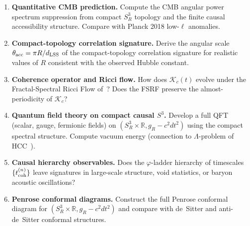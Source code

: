 \documentclass[12pt,a4paper]{article}
\theoremstyle{plain}
\theoremstyle{definition}
\theoremstyle{remark}
\newcommand{\vph}{\varphi}
\begin{document}
\begin{enumerate}[label=\textbf{Q\arabic*.},leftmargin=1.8em]
  \item \textbf{Quantitative CMB prediction.}
    Compute the CMB angular power spectrum suppression from compact $S^3_R$
    topology and the finite causal accessibility structure.
    Compare with Planck 2018 low-$\ell$ anomalies.
  \item \textbf{Compact-topology correlation signature.}
    Derive the angular scale $\theta_{\rm acc} = \pi R/d_{\rm LSS}$
    of the compact-topology correlation signature
    for realistic values of $R$ consistent with the observed Hubble constant.
  \item \textbf{Coherence operator and Ricci flow.}
    How does $\mathcal{K}_c(t)$ evolve under the Fractal-Spectral Ricci Flow
    of~\cite{PB25a}?
    Does the FSRF preserve the almost-periodicity of $\mathcal{K}_c$?
  \item \textbf{Quantum field theory on compact causal $S^3$.}
    Develop a full QFT (scalar, gauge, fermionic fields) on
    $(S^3_R\times\mathbb{R}, g_R - c^2dt^2)$ using the compact spectral structure.
    Compute vacuum energy (connection to $\Lambda$-problem of HCC~\cite{HCC25}).
  \item \textbf{Causal hierarchy observables.}
    Does the $\vph$-ladder hierarchy of timescales $\{t_{\rm coh}^{(n)}\}$
    leave signatures in large-scale structure, void statistics, or baryon
    acoustic oscillations?
  \item \textbf{Penrose conformal diagrams.}
    Construct the full Penrose conformal diagram for
    $(S^3_R\times\mathbb{R}, g_R - c^2 dt^2)$ and compare with
    de~Sitter and anti-de~Sitter conformal structures.
\end{enumerate}
\end{document}
